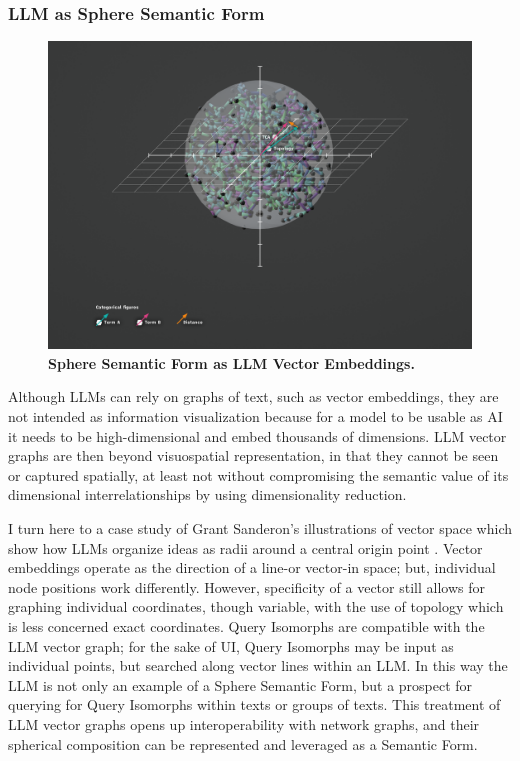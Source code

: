 \subsubsection{LLM as Sphere Semantic Form}
\FloatBarrier  
\begin{figure}[h!]
    \centering
    \includegraphics[width=\textwidth]{figures/5.15.Sphere LLM.png}
    \caption[Sphere Semantic Form as LLM Vector Embeddings]{ \textbf{Sphere Semantic Form as LLM Vector Embeddings.}
}
    \label{f5.15.Sphere LLM}
\end{figure}
\FloatBarrier  

Although LLMs can rely on graphs of text, such as vector embeddings, they are not intended as information visualization because for a model to be usable as AI it needs to be high-dimensional and embed thousands of dimensions. LLM vector graphs are then beyond visuospatial representation, in that they cannot be seen or captured spatially, at least not without compromising the semantic value of its dimensional interrelationships by using dimensionality reduction.

I turn here to a case study of Grant Sanderon’s illustrations of vector space which show how LLMs organize ideas as radii around a central origin point \citep{sanderson_attention_2024}. Vector embeddings operate as the direction of a line-or vector-in space; but, individual node positions work differently. However, specificity of a vector still allows for graphing individual coordinates, though variable, with the use of topology which is less concerned exact coordinates. Query Isomorphs are compatible with the LLM vector graph; for the sake of UI, Query Isomorphs may be input as individual points, but searched along vector lines within an LLM. In this way the LLM is not only an example of a Sphere Semantic Form, but a prospect for querying for Query Isomorphs within texts or groups of texts. This treatment of LLM vector graphs opens up interoperability with network graphs, and their spherical composition can be represented and leveraged as a Semantic Form.



